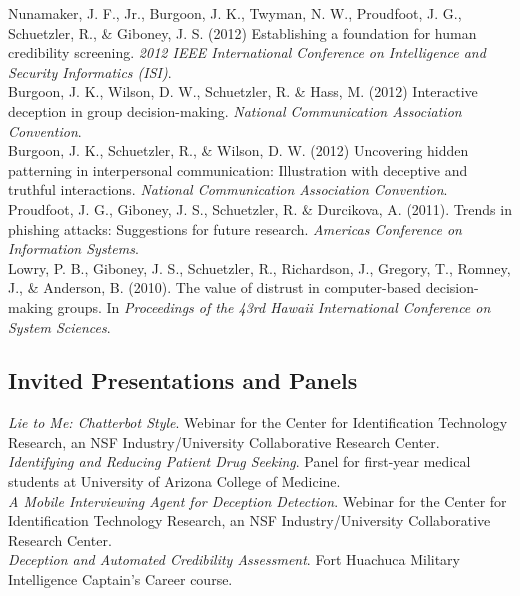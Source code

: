 \documentclass[10pt, a4paper]{article}
\newcommand{\years}[1]{\marginnote{\scriptsize #1}}
\begin{document}
Nunamaker, J. F., Jr., Burgoon, J. K., Twyman, N. W., Proudfoot, J. G.,
Schuetzler, R., \& Giboney, J. S. (2012) Establishing a foundation for human
credibility screening. \emph{2012 IEEE International Conference on Intelligence
  and Security Informatics (ISI)}.\\

Burgoon, J. K., Wilson, D. W., Schuetzler, R. \& Hass, M. (2012) Interactive
deception in group decision-making. \emph{National Communication Association
  Convention}.\\

Burgoon, J. K., Schuetzler, R., \& Wilson, D. W. (2012) Uncovering hidden
patterning in interpersonal communication: Illustration with deceptive and
truthful interactions. \emph{National Communication Association Convention}.\\
\newpage
\years{2011}Proudfoot, J. G., Giboney, J. S., Schuetzler, R. \& Durcikova,
A. (2011). Trends in phishing attacks: Suggestions for future
research. \emph{Americas Conference on Information Systems}.\\

\years{2010}Lowry, P. B., Giboney, J. S., Schuetzler, R., Richardson, J.,
Gregory, T., Romney, J., \& Anderson, B. (2010). The value of distrust in
computer-based decision-making groups. In \emph{Proceedings of the 43rd Hawaii
  International Conference on System Sciences}.

\subsection*{Invited Presentations and Panels}
\noindent

\years{2015}\emph{Lie to Me: Chatterbot Style}. Webinar for the Center for Identification
Technology Research, an NSF Industry/University Collaborative Research Center.\\

\years{2014}\emph{Identifying and Reducing Patient Drug Seeking}. Panel for first-year
medical students at University of Arizona College of Medicine.\\

\emph{A Mobile Interviewing Agent for Deception Detection}. Webinar for the
Center for Identification Technology Research, an NSF Industry/University Collaborative
Research Center.\\

\years{2012-2014}\emph{Deception and Automated Credibility Assessment}. Fort Huachuca
Military Intelligence Captain's Career course.
\end{document}
